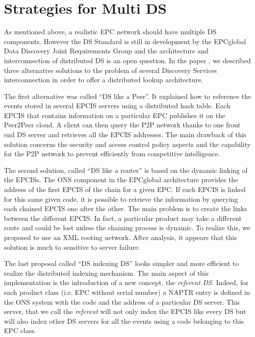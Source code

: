 \documentclass[a4paper]{llncs}
\begin{document}
\section{Strategies for Multi DS}
\label{sec:strategies}

As mentioned above, a realistic EPC network should have multiple DS
components. However the DS Standard is still in development by the EPCglobal
Data Discovery Joint Requirements Group and the architecture and
interconnection of distributed DS is an open question. In the paper
\cite{AI-LEMOULEC-2009}, we described three alternative solutions to the
problem of several Discovery Services interconnection in order to offer a
distributed lookup architecture.

The first alternative was called ``DS like a Peer''. It explained how to
reference the events stored in several EPCIS servers using a distributed
hash table. Each EPCIS that contains information on a particular EPC publishes
it on the Peer2Peer cloud. A client can then query the P2P network thanks to one
front end DS server and retrieves all the EPCIS addresses. The main drawback of
this solution concerns the security and access control policy aspects and the
capability for the P2P network to prevent efficiently from competitive intelligence.

The second solution, called ``DS like a router'' is based on the dynamic
linking of the EPCISs. The ONS component in the EPCglobal architecture provides
the address of the first EPCIS of the chain for a given EPC. If each EPCIS is
linked for this same given code, it is possible to retrieve the information by
querying each chained EPCIS one after the other. The main problem is to create
the links between the different EPCIS. In fact, a particular product may take a
different route and could be lost unless the chaining process is dynamic.  To
realize this, we proposed to use an XML rooting network. After analysis, it
appears that this solution is much to sensitive to server failure.

The last proposal called ``DS indexing DS'' looks simpler and more efficient to
realize the distributed indexing mechanism. The main aspect of this
implementation is the introduction of a new concept, the \emph{referent DS}. Indeed,
for each product class (i.e. EPC without serial number) a NAPTR entry is
defined in the ONS system with the code and  the address of a particular DS server. This
server, that we call the \emph{referent} will not only index the EPCIS like
every DS but will also index other DS servers for all the events using a code
belonging to this EPC class. 
\end{document}
